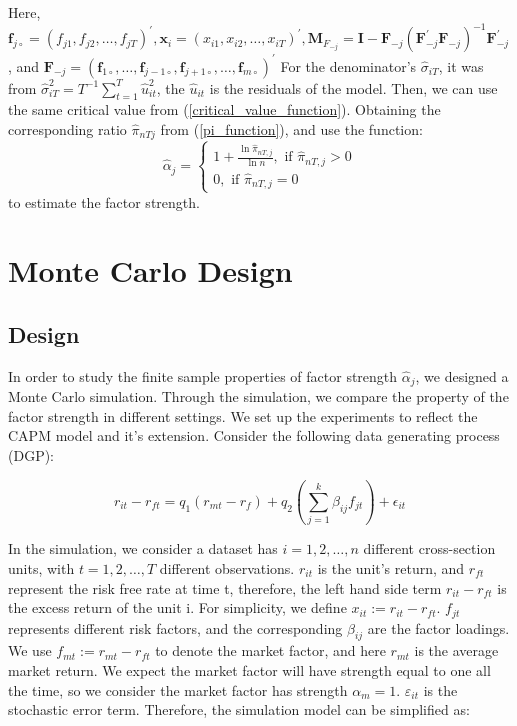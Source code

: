 Here, $\mathbf{f}_{j \circ}=\left(f_{j 1}, f_{j 2}, \ldots, f_{j T}\right)^{\prime}, \mathbf{x}_{i}=\left(x_{i 1}, x_{i 2}, \ldots, x_{i T}\right)^{\prime}, \mathbf{M}_{F_{-j}}=\mathbf{I}-\mathbf{F}_{-j}\left(\mathbf{F}_{-j}^{\prime} \mathbf{F}_{-j}\right)^{-1} \mathbf{F}_{-j}^{\prime}$, and $\mathbf{F}_{-j}=\left(\mathbf{f}_{1 \circ}, \ldots, \mathbf{f}_{j-1 \circ}, \mathbf{f}_{j+1 \circ}, \ldots, \mathbf{f}_{m \circ}\right)^{\prime}$
For the denominator's $\hat{\sigma}_{iT}$, it was from $\hat{\sigma}_{i T}^{2}=T^{-1} \sum_{t=1}^{T} \hat{u}_{i t}^{2}$, the $\hat{u}_{it}$ is the residuals of the model.
Then, we can use the same critical value from (\ref{critical_value_function}).
Obtaining the corresponding ratio $\hat{\pi}_{nTj}$  from (\ref{pi_function}), and use the function:
\begin{equation*}
\hat{\alpha}_{j}=\left\{\begin{array}{l}
1+\frac{\ln \hat{\pi}_{n T, j}}{\ln n}, \text { if } \hat{\pi}_{n T, j}>0 \\
0, \text { if } \hat{\pi}_{n T, j}=0
\end{array}\right.
\end{equation*}
to estimate the factor strength.


	\section{Monte Carlo Design}\label{MC}
	\subsection{Design}
In order to study the finite sample properties of factor strength $\hat{\alpha}_j$, we designed a Monte Carlo simulation.
Through the simulation, we compare the property of the factor strength in different settings.
We set up the experiments to reflect the CAPM model and it's extension.
Consider the following data generating process (DGP):

	\[ r_{it} - r_{ft} = q_1({r_{mt}} - r_f) + q_2( \sum_{j=1}^k\beta_{ij}f_{jt}) +\epsilon_{it} \]


In the simulation, we consider a dataset has $i = 1, 2,\dots, n$ different cross-section units, with $t= 1, 2,\dots, T$ different observations. 
$r_{it}$ is the unit's return, and $r_{ft}$ represent the risk free rate at time t, therefore, the left hand side term $r_{it} - r_{ft}$ is the excess return of the unit i.
For simplicity, we define $x_{it} := r_{it}- r_{ft}$.
$f_{jt}$ represents different risk factors, and the corresponding  $\beta_{ij}$ are the factor loadings.
We use $f_{mt}:=r_{mt} - r_{ft}$ to denote the market factor, and here $r_{mt}$ is the average market return.
We expect the market factor will have strength equal to one all the time, so we consider the market factor has strength $\alpha_m = 1$.
$\varepsilon_{it}$ is the stochastic error term.
Therefore, the simulation model can be simplified as:

